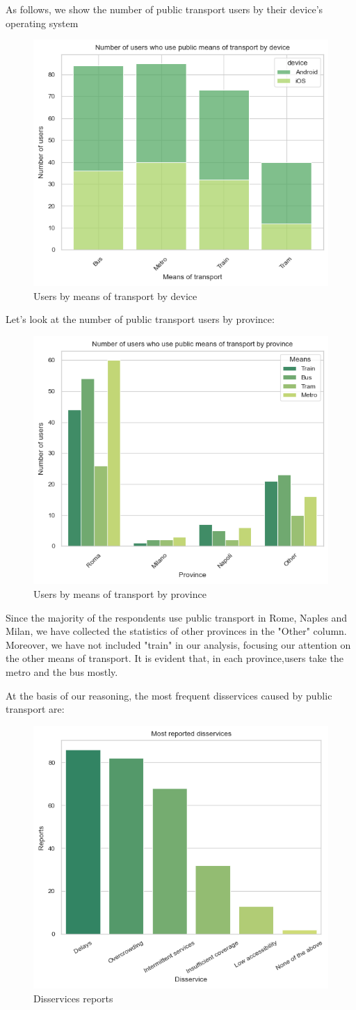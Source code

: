 \documentclass[a4paper, 11pt]{report}
\begin{document}
As follows, we show the number of public transport users by their device's operating system
\begin{figure}[H]
	\centering
 	\includegraphics[width=.5\textwidth]{img/analysis/users_by_means_of_transport_by_device.png}
 	\caption{Users by means of transport by device}
\end{figure}

Let's look at the number of public transport users by province: 
\begin{figure}[H]
	\centering
 	\includegraphics[width=.5\textwidth]{img/analysis/users_by_means_of_transport_by_province.png}
 	\caption{Users by means of transport by province}
\end{figure}

Since the majority of the respondents use public transport in Rome, Naples and Milan, we have collected the statistics of other provinces in the "Other" column.
Moreover, we have not included "train" in our analysis, focusing our attention on the other means of transport. 
It is evident that, in each province,users take the metro and the bus mostly.  


At the basis of our reasoning, the most frequent disservices caused by public transport are: 
\begin{figure}[H]
	\centering
 	\includegraphics[width=.5\textwidth]{img/analysis/disservices_reports.png}
 	\caption{Disservices reports}
\end{figure}
\end{document}
